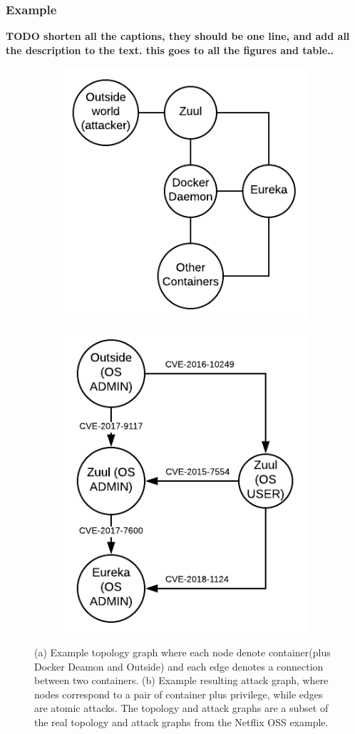 \subsubsection{Example}

\textbf{TODO shorten all the captions, they should be one line, and add all the description to the text. this goes to all the figures and table..}\\
\begin{figure}[!h]
	\centering
	\begin{subfigure}[b]{\columnwidth}
		\centering
		\includegraphics[width=.5\linewidth]{./images/Topology_graph}
		\caption{}
		\label{TopologyGraph}
	\end{subfigure}
	\hfill
	\begin{subfigure}[b]{\columnwidth}
		\centering
		\includegraphics[width=.5\linewidth]{./images/Attack_graph}
		\caption{}
		\label{AttackGraph}
	\end{subfigure}
	
	\caption[Two numerical solutions]{(a) Example topology graph where each node denote container(plus Docker Deamon and Outside) and each edge denotes a connection between two containers. (b) Example resulting attack graph, where nodes correspond to a pair of container plus privilege, while edges are atomic attacks. The topology and attack graphs are a subset of the real topology and attack graphs from the Netflix OSS example.}
\end{figure}


